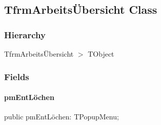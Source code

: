 \documentclass{report}
\begin{document}
\subsection*{TfrmArbeitsÜbersicht Class}
\subsubsection*{\large{\textbf{Hierarchy}}\normalsize\hspace{1ex}\hfill}
TfrmArbeitsÜbersicht {$>$} TObject
\subsubsection*{\large{\textbf{Fields}}\normalsize\hspace{1ex}\hfill}
\paragraph*{pmEntLöchen}\hspace*{\fill}

\begin{list}{}{
\setlength{\itemindent}{0cm}
\setlength{\listparindent}{0cm}
\setlength{\leftmargin}{\evensidemargin}
\addtolength{\leftmargin}{\tmplength}
\settowidth{\labelsep}{X}
\addtolength{\leftmargin}{\labelsep}
\setlength{\labelwidth}{\tmplength}
}
\begin{flushleft}
\item[\textbf{Declaration}\hfill]
\begin{ttfamily}
public pmEntLöchen: TPopupMenu;\end{ttfamily}


\end{flushleft}
\end{list}
\end{document}
